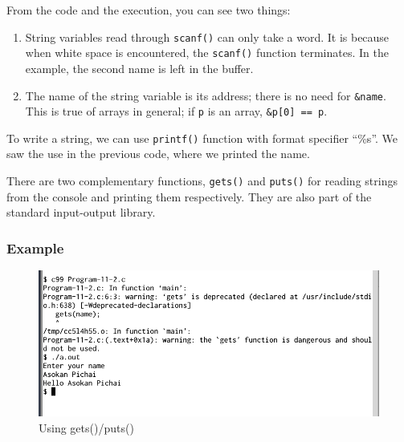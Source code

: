 \documentclass[11pt,a4paper]{article}
\begin{document}
From the code and the execution, you can see two things:
\begin{enumerate}
  \item String variables read through \texttt{scanf()} can only take a word. It is because when white space is encountered, the \texttt{scanf()} function terminates. In the example, the second name is left in the buffer.
  \item The name of the string variable is its address; there is no need for \texttt{\&name}. This is true of arrays in general; if \texttt{p} is an array, \texttt{\&p[0] == p}.
\end{enumerate}

To write a string, we can use \texttt{printf()} function with format specifier ``\%s''. We saw the use in the previous code, where we printed the name.

There are two complementary functions, \texttt{gets()} and \texttt{puts()} for reading strings from the console and printing them respectively. They are also part of the standard input-output library.

\subsubsection*{Example} 



\begin{figure}[ht]
\begin{center}
\includegraphics[scale=0.5]{Output-11-2.png}
\caption{Using gets()/puts()}
\label{output-11-2}
\end{center}
\end{figure}
\end{document}
